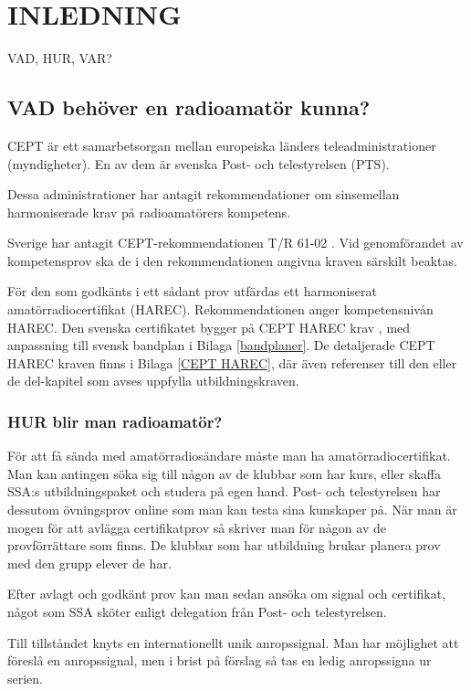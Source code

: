 \chapter*{INLEDNING}

\Huge{VAD, HUR, VAR?}\normalsize

\section*{VAD behöver en radioamatör kunna?}

CEPT är ett samarbetsorgan mellan europeiska länders teleadministrationer
(myndigheter). En av dem är svenska Post- och telestyrelsen (PTS).

Dessa administrationer har antagit rekommendationer om sinsemellan
harmoniserade krav på radioamatörers kompetens.

Sverige har antagit CEPT-rekommendationen T/R 61-02 \cite{TR6102}.
Vid genomförandet av kompetensprov ska de i den rekommendationen
angivna kraven särskilt beaktas.

För den som godkänts i ett sådant prov utfärdas ett harmoniserat
amatörradiocertifikat (HAREC).
Rekommendationen anger kompetensnivån HAREC.
Den svenska certifikatet bygger på CEPT HAREC krav \cite{TR6102},
med anpassning till svensk bandplan i Bilaga \ref{bandplaner}.
De detaljerade CEPT HAREC kraven finns i Bilaga \ref{CEPT HAREC}, där även
referenser till den eller de del-kapitel som avses uppfylla utbildningskraven.

\subsection*{HUR blir man radioamatör?}

För att få sända med amatörradiosändare måste man ha amatörradiocertifikat.
Man kan antingen söka sig till någon av de klubbar som har kurs, eller skaffa
SSA:s utbildningspaket och studera på egen hand. Post- och telestyrelsen har
dessutom övningsprov online som man kan testa sina kunskaper på.
När man är mogen för att avlägga certifikatprov så skriver man för någon av de
provförrättare som finns. De klubbar som har utbildning brukar planera prov
med den grupp elever de har.

Efter avlagt och godkänt prov kan man sedan ansöka om signal och certifikat,
något som SSA sköter enligt delegation från Post- och telestyrelsen.

Till tillståndet knyts en internationellt unik anropssignal. Man har möjlighet
att föreslå en anropssignal, men i brist på förslag så tas en ledig anropssigna
ur serien.

